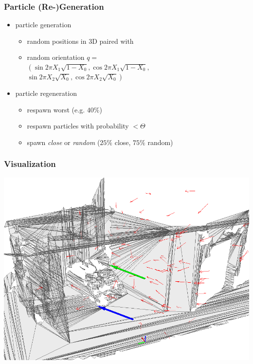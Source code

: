 \documentclass{beamer}
\begin{document}
\begin{frame}
  \frametitle{Particle (Re-)Generation}
  \begin{itemize}
    \item particle generation
          \begin{itemize}
            \item random positions in 3D paired with
            \item \parbox[t]{.6\textwidth}{random orientation $q=$\\
                  $\left(\sin{2\pi X_1\sqrt{1-X_0}},\cos{ 2\pi X_1 \sqrt{1-X_0}},\right.$\\
                  $\left.\sin{2\pi X_2\sqrt{X_0}},\cos{2\pi X_2\sqrt{X_0}}\right)$\\\cite{gfxgems:1995}}
          \end{itemize}
    \item particle regeneration
          \begin{itemize}
            \item respawn worst (e.g. $40 \%$)
            \item respawn particles with probability $< \Theta$
            \item spawn \textsl{close} or \textsl{random} ($25 \%$ close, $75 \%$ random)
          \end{itemize}
  \end{itemize}
  
\end{frame}

\begin{frame}
  \frametitle{Visualization}
  \begin{center}
    \includegraphics[width=\textwidth]{../pics/amclaction}
  \end{center}
\end{frame}
\end{document}

